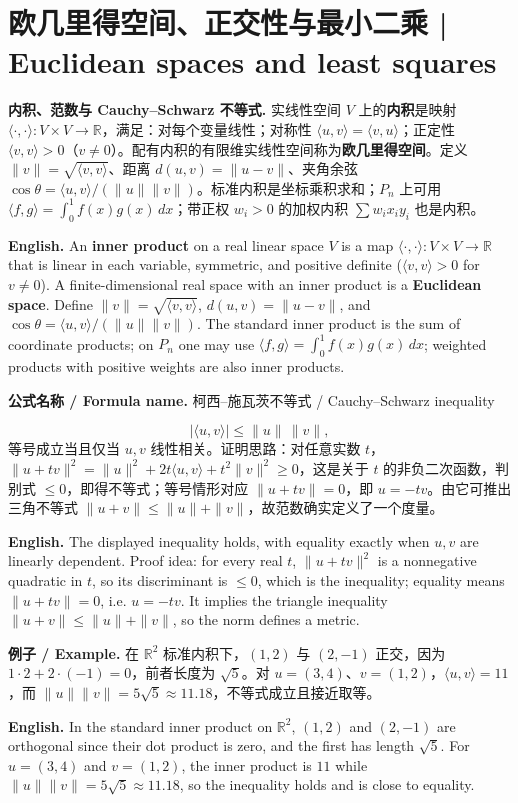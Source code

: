 \documentclass[UTF8,11pt,a4paper]{ctexart}
\newcommand{\EN}[1]{\par\noindent\textbf{English.} #1\par}
\newcommand{\FORMULA}[2]{\par\noindent\textbf{公式名称 / Formula name.} #1 / #2\par}
\newcommand{\EX}[2]{\par\noindent\textbf{例子 / Example.} #1\par\EN{#2}}
\begin{document}
\section[欧几里得空间与最小二乘]{欧几里得空间、正交性与最小二乘 | Euclidean spaces and least squares}
\noindent\textbf{内积、范数与 Cauchy--Schwarz 不等式.} 实线性空间 $V$ 上的\textbf{内积}是映射 $\langle\cdot,\cdot\rangle:V\times V\to\mathbb R$，满足：对每个变量线性；对称性 $\langle u,v\rangle=\langle v,u\rangle$；正定性 $\langle v,v\rangle>0$（$v\ne0$）。配有内积的有限维实线性空间称为\textbf{欧几里得空间}。定义 $\|v\|=\sqrt{\langle v,v\rangle}$、距离 $d(u,v)=\|u-v\|$、夹角余弦 $\cos\theta=\langle u,v\rangle/(\|u\|\|v\|)$。标准内积是坐标乘积求和；$P_n$ 上可用 $\langle f,g\rangle=\int_0^1f(x)g(x)\,dx$；带正权 $w_i>0$ 的加权内积 $\sum w_ix_iy_i$ 也是内积。
\EN{An \textbf{inner product} on a real linear space $V$ is a map $\langle\cdot,\cdot\rangle:V\times V\to\mathbb R$ that is linear in each variable, symmetric, and positive definite ($\langle v,v\rangle>0$ for $v\ne0$). A finite-dimensional real space with an inner product is a \textbf{Euclidean space}. Define $\|v\|=\sqrt{\langle v,v\rangle}$, $d(u,v)=\|u-v\|$, and $\cos\theta=\langle u,v\rangle/(\|u\|\|v\|)$. The standard inner product is the sum of coordinate products; on $P_n$ one may use $\langle f,g\rangle=\int_0^1f(x)g(x)\,dx$; weighted products with positive weights are also inner products.}
\FORMULA{柯西--施瓦茨不等式}{Cauchy--Schwarz inequality}
\[
|\langle u,v\rangle|\le\|u\|\,\|v\|,
\]
等号成立当且仅当 $u,v$ 线性相关。证明思路：对任意实数 $t$，$\|u+tv\|^2=\|u\|^2+2t\langle u,v\rangle+t^2\|v\|^2\ge0$，这是关于 $t$ 的非负二次函数，判别式 $\le0$，即得不等式；等号情形对应 $\|u+tv\|=0$，即 $u=-tv$。由它可推出三角不等式 $\|u+v\|\le\|u\|+\|v\|$，故范数确实定义了一个度量。
\EN{The displayed inequality holds, with equality exactly when $u,v$ are linearly dependent. Proof idea: for every real $t$, $\|u+tv\|^2$ is a nonnegative quadratic in $t$, so its discriminant is $\le0$, which is the inequality; equality means $\|u+tv\|=0$, i.e. $u=-tv$. It implies the triangle inequality $\|u+v\|\le\|u\|+\|v\|$, so the norm defines a metric.}
\EX{在 $\mathbb R^2$ 标准内积下，$(1,2)$ 与 $(2,-1)$ 正交，因为 $1\cdot2+2\cdot(-1)=0$，前者长度为 $\sqrt5$。对 $u=(3,4)$、$v=(1,2)$，$\langle u,v\rangle=11$，而 $\|u\|\|v\|=5\sqrt5\approx11.18$，不等式成立且接近取等。}{In the standard inner product on $\mathbb R^2$, $(1,2)$ and $(2,-1)$ are orthogonal since their dot product is zero, and the first has length $\sqrt5$. For $u=(3,4)$ and $v=(1,2)$, the inner product is $11$ while $\|u\|\|v\|=5\sqrt5\approx11.18$, so the inequality holds and is close to equality.}
\end{document}
